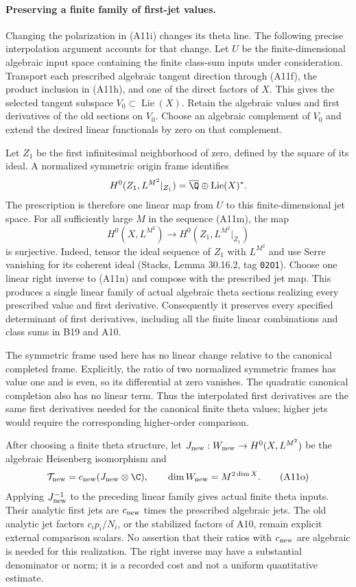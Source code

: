 \paragraph{Preserving a finite family of first-jet values.}
Changing the polarization in (A11i) changes its theta line.
The following precise interpolation argument accounts for
that change.  Let $U$ be the finite-dimensional algebraic input
space containing the finite class-sum inputs under consideration.
Transport each prescribed algebraic tangent direction through
(A11f), the product inclusion in (A11h), and one of the direct
factors of $X$.  This gives the selected tangent subspace
$V_0\subset\operatorname{Lie}(X)$.  Retain the algebraic
values and first derivatives of the old sections on $V_0$.
Choose an algebraic complement of $V_0$ and extend the desired
linear functionals by zero on that complement.

Let $Z_1$ be the first infinitesimal neighborhood of zero,
defined by the square of its ideal.  A normalized symmetric
origin frame identifies
\[
       H^0(Z_1,L^{M^2}|_{Z_1})
                    =\overline\Q\oplus\operatorname{Lie}(X)^*.
\]
The prescription is therefore one linear map from $U$ to this
finite-dimensional jet space.  For all sufficiently large
$M$ in the sequence (A11m), the map
\[
 H^0(X,L^{M^2})\longrightarrow H^0(Z_1,L^{M^2}|_{Z_1})
 \tag{A11n}
\]
is surjective.  Indeed, tensor the ideal sequence of $Z_1$
with $L^{M^2}$ and use Serre vanishing for its coherent ideal
(Stacks, Lemma 30.16.2, tag \texttt{02O1}).  Choose one linear
right inverse to (A11n) and compose with the prescribed jet
map.  This produces a single linear family of actual algebraic
theta sections realizing every prescribed value and first
derivative.  Consequently it preserves every specified
determinant of first derivatives, including all the finite
linear combinations and class sums in B19 and A10.

The symmetric frame used here has no linear change relative
to the canonical completed frame.  Explicitly, the ratio of
two normalized symmetric frames has value one and is even,
so its differential at zero vanishes.  The quadratic canonical
completion also has no linear term.  Thus the interpolated
first derivatives are the same first derivatives needed for
the canonical finite theta values; higher jets would require
the corresponding higher-order comparison.

After choosing a finite theta structure, let
$J_{\rm new}:W_{\rm new}\to H^0(X,L^{M^2})$ be the algebraic
Heisenberg isomorphism and
\[
        \mathcal T_{\rm new}
               =c_{\rm new}(J_{\rm new}\otimes\C),
        \qquad \dim W_{\rm new}=M^{2\dim X}.
 \tag{A11o}
\]
Applying $J_{\rm new}^{-1}$ to the preceding linear family
gives actual finite theta inputs.  Their analytic first jets
are $c_{\rm new}$ times the prescribed algebraic jets.  The
old analytic jet factors $c_i p_i/N_i$, or the stabilized
factors of A10, remain explicit external comparison scalars.
No assertion that their ratios with $c_{\rm new}$ are
algebraic is needed for this realization.  The right inverse
may have a substantial denominator or norm; it is a recorded
cost and not a uniform quantitative estimate.


